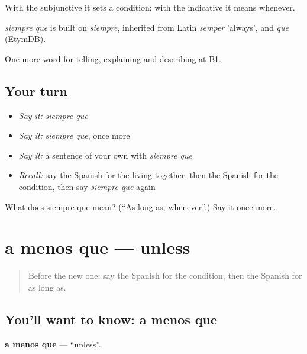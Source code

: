 With the subjunctive it sets a condition; with the indicative it means whenever.

\begin{cousinweb}
\emph{siempre que} is built on \emph{siempre}, inherited from Latin \emph{semper} 'always', and \emph{que} (EtymDB).
\end{cousinweb}

\begin{grammarlens}[title={What you've built}]
One more word for telling, explaining and describing at B1.
\end{grammarlens}

\subsection*{Your turn}
\begin{itemize}
\raggedright
  \item \emph{Say it:} \emph{siempre que}
  \item \emph{Say it:} \emph{siempre que}, once more
  \item \emph{Say it:} a sentence of your own with \emph{siempre que}
  \item \emph{Recall:} say the Spanish for the living together, then the Spanish for the condition, then say \emph{siempre que} again
\end{itemize}

\begin{tcolorbox}[breakable,colback=teal!4,colframe=teal!35!black,title={Before you move on}]
What does siempre que mean? (\textquotedblleft{}As long as; whenever\textquotedblright{}.) Say it once more.
\end{tcolorbox}
\section[a menos que]{a menos que — unless}

\label{lesson:ES-C611-a-menos-que}



\begin{quote}
Before the new one: say the Spanish for the condition, then the Spanish for as long as.
\end{quote}

\subsection*{You'll want to know: a menos que}
\textbf{a menos que} — \textquotedblleft{}unless\textquotedblright{}.

